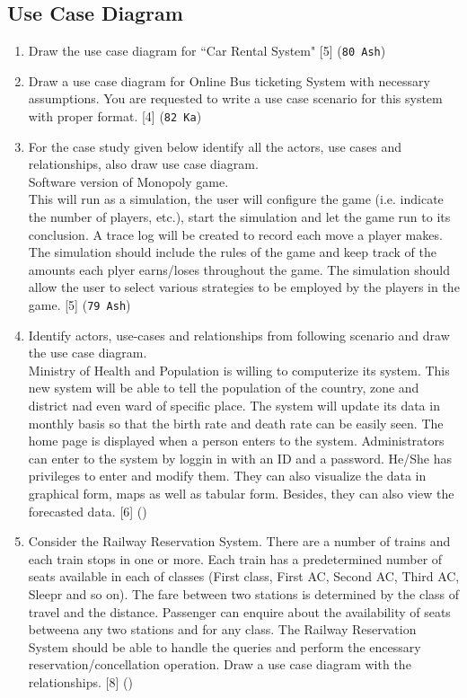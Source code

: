 \documentclass[12pt]{article}
\begin{document}
  \subsection{Use Case Diagram}
    \begin{enumerate}
      \item Draw the use case diagram for ``Car Rental System" \hfill [5] (\texttt{80 Ash})

      \item Draw a use case diagram for Online Bus ticketing System with necessary assumptions. You are requested to write a use case scenario for this system with proper format. \hfill [4] (\texttt{82 Ka})

      \item For the case study given below identify all the actors, use cases and relationships, also draw use case diagram.\\
        Software version of Monopoly game.\\
        This will run as a simulation, the user will configure the game (i.e. indicate the number of players, etc.), start the simulation and let the game run to its conclusion. A trace log will be created to record each move a player makes. The simulation should include the rules of the game and keep track of the amounts each plyer earns/loses throughout the game. The simulation should allow the user to select various strategies to be employed by the players in the game. \hfill [5] (\texttt{79 Ash})
      
      \item Identify actors, use-cases and relationships from following scenario and draw the use case diagram.\\
        Ministry of Health and Population is willing to computerize its system. This new system will be able to tell the population of the country, zone and district nad even ward of specific place. The system will update its data in monthly basis so that the birth rate and death rate can be easily seen. The home page is displayed when a person enters to the system. Administrators can enter to the system by loggin in with an ID and a password. He/She has privileges to enter and modify them. They can also visualize the data in graphical form, maps as well as tabular form. Besides, they can also view the forecasted data. \hfill [6] ()

      \item Consider the Railway Reservation System. There are a number of trains and each train stops in one or more. Each train has a predetermined number of seats available in each of classes (First class, First AC, Second AC, Third AC, Sleepr and so on). The fare between two stations is determined by the class of travel and the distance. Passenger can enquire about the availability of seats betweena any two stations and for any class. The Railway Reservation System should be able to handle the queries and perform the encessary reservation/concellation operation. Draw a use case diagram with the relationships. \hfill [8] ()


\end{enumerate}
\end{document}
